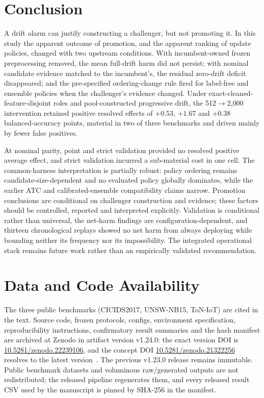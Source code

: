 \documentclass[journal]{IEEEtran}
\begin{document}
\section{Conclusion}


A drift alarm can justify constructing a challenger, but not promoting it. In this study the apparent outcome of promotion, and the apparent ranking of update policies, changed with two upstream conditions. With incumbent-owned frozen preprocessing removed, the mean full-drift harm did not persist; with nominal candidate evidence matched to the incumbent's, the residual zero-drift deficit disappeared; and the pre-specified ordering-change rule fired for label-free and ensemble policies when the challenger's evidence changed. Under exact-cleaned-feature-disjoint roles and pool-constructed progressive drift, the 512$\to$2{,}000 intervention retained positive resolved effects of $+0.53$, $+1.67$ and $+0.38$ balanced-accuracy points, material in two of three benchmarks and driven mainly by fewer false positives.

At nominal parity, point and strict validation provided no resolved positive average effect, and strict validation incurred a sub-material cost in one cell. The common-harness interpretation is partially robust: policy ordering remains candidate-size-dependent and no evaluated policy globally dominates, while the earlier ATC and calibrated-ensemble compatibility claims narrow. Promotion conclusions are conditional on challenger construction and evidence; these factors should be controlled, reported and interpreted explicitly. Validation is conditional rather than universal, the net-harm findings are configuration-dependent, and thirteen chronological replays showed no net harm from always deploying while bounding neither its frequency nor its impossibility. The integrated operational stack remains future work rather than an empirically validated recommendation.




\section*{Data and Code Availability}
The three public benchmarks (CICIDS2017, UNSW-NB15, ToN-IoT) are cited in the text. Source code, frozen protocols, configs, environment specification, reproducibility instructions, confirmatory result summaries and the hash manifest are archived at Zenodo in artifact version v1.24.0: the exact version DOI is \href{https://doi.org/10.5281/zenodo.22239106}{10.5281/zenodo.22239106}, and the concept DOI \href{https://doi.org/10.5281/zenodo.21322256}{10.5281/zenodo.21322256} resolves to the latest version~\cite{fernandezbarrios2026artifact}. The previous v1.23.0 release remains immutable. Public benchmark datasets and voluminous raw/generated outputs are not redistributed; the released pipeline regenerates them, and every released result CSV used by the manuscript is pinned by SHA-256 in the manifest.
\end{document}
